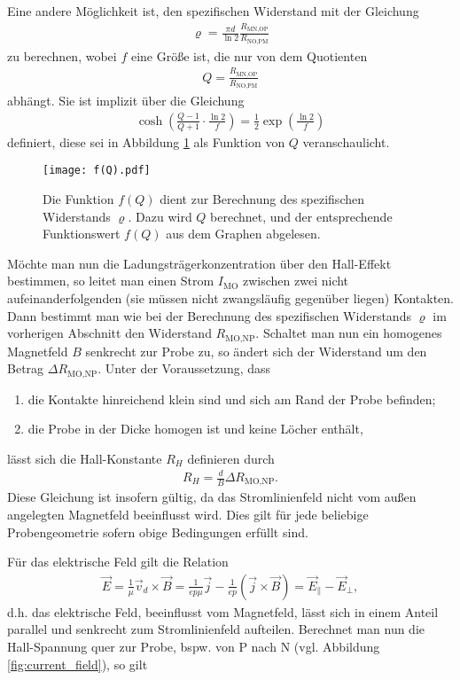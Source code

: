 Eine andere Möglichkeit ist, den spezifischen Widerstand mit der Gleichung 
\begin{align}
\varrho=\frac{\pi d}{\ln 2}\frac{R_\text{MN,OP}}{R_\text{NO,PM}}
\end{align}
zu berechnen, wobei $f$ eine Größe ist, die nur von dem Quotienten
\begin{align}
Q=\frac{R_\text{MN,OP}}{R_\text{NO,PM}}
\end{align}
abhängt. Sie ist implizit über die Gleichung
\begin{align}
\cosh\left(\frac{Q-1}{Q+1}\cdot\frac{\ln 2}{f}\right)=\frac{1}{2}\exp\left(\frac{\ln 2}{f}\right)
\end{align}
definiert, diese sei in Abbildung \ref{fig:f(Q)} als Funktion von $Q$ veranschaulicht.
\begin{figure}[h]
\centering
\texttt{[image: f(Q).pdf]}
\caption{Die Funktion $f(Q)$ dient zur Berechnung des spezifischen Widerstands $\varrho$. Dazu wird $Q$ berechnet, und der entsprechende Funktionswert $f(Q)$ aus dem Graphen abgelesen.}
\label{fig:f(Q)}
\end{figure}

\newpage
Möchte man nun die Ladungsträgerkonzentration über den Hall-Effekt bestimmen, so leitet man einen Strom $I_\text{MO}$ zwischen zwei nicht aufeinanderfolgenden (sie müssen nicht zwangsläufig gegenüber liegen) Kontakten. Dann bestimmt man wie bei der Berechnung des spezifischen Widerstands $\varrho$ im vorherigen Abschnitt den Widerstand $R_\text{MO,NP}$. Schaltet man nun ein homogenes Magnetfeld $B$ senkrecht zur Probe zu, so ändert sich der Widerstand um den Betrag $\Delta R_\text{MO,NP}$.
Unter der Voraussetzung, dass
\begin{enumerate}
\item die Kontakte hinreichend klein sind und sich am Rand der Probe befinden;
\item die Probe in der Dicke homogen ist und keine Löcher enthält,
\end{enumerate}
lässt sich die Hall-Konstante $R_H$ definieren durch
\begin{align}
R_H=\frac{d}{B}\Delta R_\text{MO,NP}.
\end{align}
Diese Gleichung ist insofern gültig, da das Stromlinienfeld nicht vom außen angelegten Magnetfeld beeinflusst wird. Dies gilt für jede beliebige Probengeometrie sofern obige Bedingungen erfüllt sind.

Für das elektrische Feld gilt die Relation
\begin{align}
\vec{E}=\frac{1}{\mu}\vec{v}_d\times \vec{B}=\frac{1}{ep\mu}\vec{j}-\frac{1}{ep}(\vec{j}\times \vec{B})=\vec{E}_{\parallel}-\vec{E}_{\perp},
\end{align}
d.h. das elektrische Feld, beeinflusst vom Magnetfeld, lässt sich in einem Anteil parallel und senkrecht zum Stromlinienfeld aufteilen. Berechnet man nun die Hall-Spannung quer zur Probe, bspw. von P nach N (vgl. Abbildung \ref{fig:current_field}), so gilt


